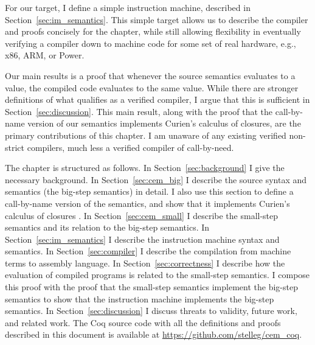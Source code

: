 For our target, I define a simple instruction machine, described in
Section~\ref{sec:im_semantics}. This simple target allows us to describe the
compiler and proofs concisely for the chapter, while still allowing
flexibility in eventually verifying a compiler down to machine code for some
set of real hardware, e.g., x86, ARM, or Power. 

Our main results is a proof that whenever the source semantics evaluates to a
value, the compiled code evaluates to the same value. While there are stronger
definitions of what qualifies as a verified compiler, I argue that this is
sufficient in Section~\ref{sec:discussion}. This main result, along with the
proof that the call-by-name version of our semantics implements Curien's
calculus of closures, are the primary contributions of this chapter. I am
unaware of any existing verified non-strict compilers, much less a verified
compiler of call-by-need. 

The chapter is structured as follows. In Section~\ref{sec:background} I give the
necessary background. In Section~\ref{sec:cem_big} I describe the source syntax
and semantics (the big-step \ce semantics) in detail.  I also use
this section to define a call-by-name version of the semantics, and
show that it implements Curien's calculus of closures \cite{curien1991abstract}.  In
Section~\ref{sec:cem_small} I describe the small-step \ce semantics
and its relation to the big-step semantics. In Section~\ref{sec:im_semantics}
I describe the instruction machine syntax and semantics. In
Section~\ref{sec:compiler} I describe the compilation from machine terms to
assembly language. In Section~\ref{sec:correctness} I describe how the evaluation
of compiled programs is related to the small-step \ce semantics. I 
compose this proof with the proof that the small-step semantics implement the
big-step semantics to show that the instruction machine implements the big-step
semantics. In Section~\ref{sec:discussion} I discuss threats to validity,
future work, and related work. The Coq source code with all the definitions and
proofs described in this document is available at
\url{https://github.com/stelleg/cem\_coq}. 
